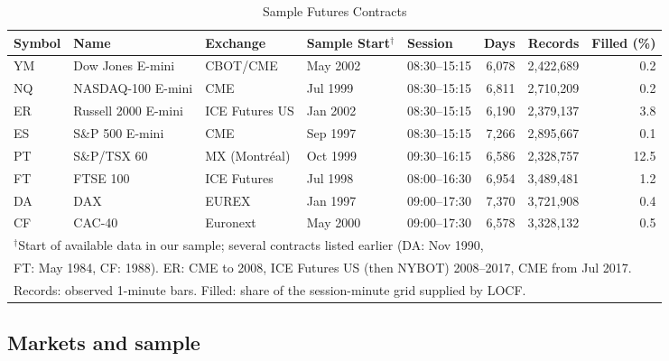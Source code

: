\documentclass[conference]{IEEEtran}
\begin{document}
\begin{table}[!t]
\begin{center}
\caption{Sample Futures Contracts}
\footnotesize
\begin{tabular}{lllllrrr}
\hline
Symbol & Name & Exchange & Sample Start$^{\dagger}$ & Session & Days & Records & Filled (\%) \\
\hline
YM & Dow Jones E-mini      & CBOT/CME          & May 2002 & 08:30--15:15 & 6{,}078 & 2{,}422{,}689 & 0.2 \\
NQ & NASDAQ-100 E-mini     & CME               & Jul 1999 & 08:30--15:15 & 6{,}811 & 2{,}710{,}209 & 0.2 \\
ER & Russell 2000 E-mini   & ICE Futures US    & Jan 2002 & 08:30--15:15 & 6{,}190 & 2{,}379{,}137 & 3.8 \\
ES & S\&P 500 E-mini       & CME               & Sep 1997 & 08:30--15:15 & 7{,}266 & 2{,}895{,}667 & 0.1 \\
PT & S\&P/TSX 60           & MX (Montr\'{e}al) & Oct 1999 & 09:30--16:15 & 6{,}586 & 2{,}328{,}757 & 12.5 \\
FT & FTSE 100              & ICE Futures       & Jul 1998 & 08:00--16:30 & 6{,}954 & 3{,}489{,}481 & 1.2 \\
DA & DAX                   & EUREX             & Jan 1997 & 09:00--17:30 & 7{,}370 & 3{,}721{,}908 & 0.4 \\
CF & CAC-40                & Euronext          & May 2000 & 09:00--17:30 & 6{,}578 & 3{,}328{,}132 & 0.5 \\
\hline
\multicolumn{8}{l}{$^{\dagger}$Start of available data in our sample; several contracts listed earlier (DA: Nov 1990,}\\
\multicolumn{8}{l}{\phantom{$^{\dagger}$}FT: May 1984, CF: 1988). ER: CME to 2008, ICE Futures US (then NYBOT) 2008--2017, CME from Jul 2017.}\\
\multicolumn{8}{l}{Records: observed 1-minute bars. Filled: share of the session-minute grid supplied by LOCF.}\\
\end{tabular}
\label{tab:markets}
\end{center}
\end{table}

\subsection{Markets and sample}
\label{sec:data:markets}
\end{document}
